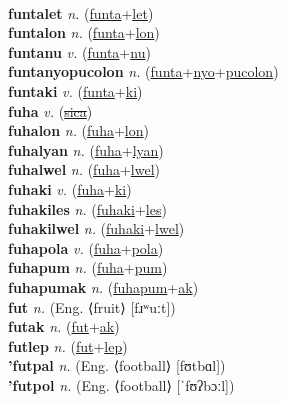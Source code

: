  \label{funta} \\
\textbf{funtalet} \textit{n.} (\hyperref[funta]{funta}+\hyperref[let]{let})
 \label{funtalet} \\
\textbf{funtalon} \textit{n.} (\hyperref[funta]{funta}+\hyperref[lon]{lon})
 \label{funtalon} \\
\textbf{funtanu} \textit{v.} (\hyperref[funta]{funta}+\hyperref[nu]{nu})
 \label{funtanu} \\
\textbf{funtanyopucolon} \textit{n.} (\hyperref[funta]{funta}+\hyperref[nyo]{nyo}+\hyperref[pucolon]{pucolon})
 \label{funtanyopucolon} \\
\textbf{funtaki} \textit{v.} (\hyperref[funta]{funta}+\hyperref[ki]{ki})
 \label{funtaki} \\
\textbf{fuha} \textit{v.} (\hyperref[sica]{\sout{sica}})
 \label{fuha} \\
\textbf{fuhalon} \textit{n.} (\hyperref[fuha]{fuha}+\hyperref[lon]{lon})
 \label{fuhalon} \\
\textbf{fuhalyan} \textit{n.} (\hyperref[fuha]{fuha}+\hyperref[lyan]{lyan})
 \label{fuhalyan} \\
\textbf{fuhalwel} \textit{n.} (\hyperref[fuha]{fuha}+\hyperref[lwel]{lwel})
 \label{fuhalwel} \\
\textbf{fuhaki} \textit{v.} (\hyperref[fuha]{fuha}+\hyperref[ki]{ki})
 \label{fuhaki} \\
\textbf{fuhakiles} \textit{n.} (\hyperref[fuhaki]{fuhaki}+\hyperref[les]{les})
 \label{fuhakiles} \\
\textbf{fuhakilwel} \textit{n.} (\hyperref[fuhaki]{fuhaki}+\hyperref[lwel]{lwel})
 \label{fuhakilwel} \\
\textbf{fuhapola} \textit{v.} (\hyperref[fuha]{fuha}+\hyperref[pola]{pola})
 \label{fuhapola} \\
\textbf{fuhapum} \textit{n.} (\hyperref[fuha]{fuha}+\hyperref[pum]{pum})
 \label{fuhapum} \\
\textbf{fuhapumak} \textit{n.} (\hyperref[fuhapum]{fuhapum}+\hyperref[ak]{ak})
 \label{fuhapumak} \\
\textbf{fut} \textit{n.} (Eng. ⟨fruit⟩ [fɹʷuːt])
 \label{fut} \\
\textbf{futak} \textit{n.} (\hyperref[fut]{fut}+\hyperref[ak]{ak})
 \label{futak} \\
\textbf{futlep} \textit{n.} (\hyperref[fut]{fut}+\hyperref[lep]{lep})
 \label{futlep} \\
\textbf{'futpal} \textit{n.} (Eng. ⟨football⟩ [fʊtbɑl])
 \label{'futpal} \\
\textbf{'futpol} \textit{n.} (Eng. ⟨football⟩ [ˈfʊʔbɔːl])
